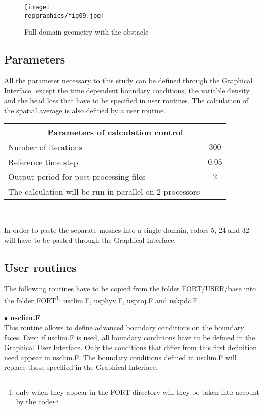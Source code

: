 \begin{figure}[h!]
\begin{center}
\texttt{[image: \\repgraphics/fig09.jpg]} 
\caption{Full domain geometry with the obstacle}
\label{figante41}
\end{center}
\end{figure}



	\subsection{Parameters}

All the parameter necessary to this study can be defined through the Graphical
Interface, except the time dependent boundary conditions, the variable
density and the head loss that have to be specified in user routines. The
calculation of the spatial average is also defined by a user routine.


\begin{center}
\begin{tabular}{|l|c|}
\hline
\multicolumn{2}{|c|}{Parameters of calculation control} \\
\hline
Number of iterations & $300$ \\
\hline
Reference time step & $0.05$ \\
\hline
Output period for post-processing files& $2$ \\
\hline
The calculation will be run in parallel on 2 processors \\
\end{tabular}\\
\end{center}

In order to paste the separate meshes into a single domain, colors 5, 24 and 32
will have to be pasted through the Graphical Interface.


	\subsection{User routines}

The following routines have to be copied from the folder FORT/USER/base into the
folder FORT\footnote{only when they appear in the FORT directory will they be
taken into account by the code}: usclim.F, usphyv.F, usproj.F and uskpdc.F.

$\bullet$ {\bfseries usclim.F}\\
This routine allows to define advanced boundary conditions on the boundary
faces. Even if usclim.F is used, all boundary conditions have to be defined in
the Graphical User Interface. Only the conditions that differ from this first
definition need appear in usclim.F. The boundary conditions defined in usclim.F
will replace those specified in the Graphical Interface.

